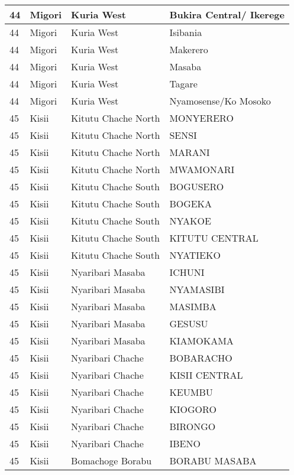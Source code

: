 \begin{table}[!ht]
\begin{tabular}{|l|l|l|l|}
        44 & Migori & Kuria West & Bukira Central/ Ikerege \\ \hline
        44 & Migori & Kuria West & Isibania \\ \hline
        44 & Migori & Kuria West & Makerero \\ \hline
        44 & Migori & Kuria West & Masaba \\ \hline
        44 & Migori & Kuria West & Tagare \\ \hline
        44 & Migori & Kuria West & Nyamosense/Ko Mosoko \\ \hline
        45 & Kisii & Kitutu Chache North & MONYERERO \\ \hline
        45 & Kisii & Kitutu Chache North & SENSI \\ \hline
        45 & Kisii & Kitutu Chache North & MARANI \\ \hline
        45 & Kisii & Kitutu Chache North & MWAMONARI \\ \hline
        45 & Kisii & Kitutu Chache South & BOGUSERO \\ \hline
        45 & Kisii & Kitutu Chache South & BOGEKA \\ \hline
        45 & Kisii & Kitutu Chache South & NYAKOE \\ \hline
        45 & Kisii & Kitutu Chache South & KITUTU CENTRAL \\ \hline
        45 & Kisii & Kitutu Chache South & NYATIEKO \\ \hline
        45 & Kisii & Nyaribari Masaba & ICHUNI \\ \hline
        45 & Kisii & Nyaribari Masaba & NYAMASIBI \\ \hline
        45 & Kisii & Nyaribari Masaba & MASIMBA \\ \hline
        45 & Kisii & Nyaribari Masaba & GESUSU \\ \hline
        45 & Kisii & Nyaribari Masaba & KIAMOKAMA \\ \hline
        45 & Kisii & Nyaribari Chache & BOBARACHO \\ \hline
        45 & Kisii & Nyaribari Chache & KISII CENTRAL \\ \hline
        45 & Kisii & Nyaribari Chache & KEUMBU \\ \hline
        45 & Kisii & Nyaribari Chache & KIOGORO \\ \hline
        45 & Kisii & Nyaribari Chache & BIRONGO \\ \hline
        45 & Kisii & Nyaribari Chache & IBENO \\ \hline
        45 & Kisii & Bomachoge Borabu & BORABU MASABA \\ \hline

\end{tabular}
\end{table}
